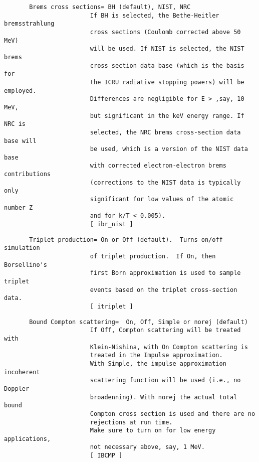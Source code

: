 \begin{verbatim}
       Brems cross sections= BH (default), NIST, NRC
                        If BH is selected, the Bethe-Heitler bremsstrahlung
                        cross sections (Coulomb corrected above 50 MeV)
                        will be used. If NIST is selected, the NIST brems
                        cross section data base (which is the basis for
                        the ICRU radiative stopping powers) will be employed.
                        Differences are negligible for E > ,say, 10 MeV,
                        but significant in the keV energy range. If NRC is
                        selected, the NRC brems cross-section data base will
                        be used, which is a version of the NIST data base
                        with corrected electron-electron brems contributions
                        (corrections to the NIST data is typically only
                        significant for low values of the atomic number Z
                        and for k/T < 0.005).
                        [ ibr_nist ]
\end{verbatim}
\begin{verbatim}
       Triplet production= On or Off (default).  Turns on/off simulation
                        of triplet production.  If On, then Borsellino's
                        first Born approximation is used to sample triplet
                        events based on the triplet cross-section data.
                        [ itriplet ]
\end{verbatim}
\begin{verbatim}
       Bound Compton scattering=  On, Off, Simple or norej (default)
                        If Off, Compton scattering will be treated with
                        Klein-Nishina, with On Compton scattering is
                        treated in the Impulse approximation.
                        With Simple, the impulse approximation incoherent
                        scattering function will be used (i.e., no Doppler
                        broadenning). With norej the actual total bound
                        Compton cross section is used and there are no
                        rejections at run time.
                        Make sure to turn on for low energy applications,
                        not necessary above, say, 1 MeV.
                        [ IBCMP ]
\end{verbatim}
